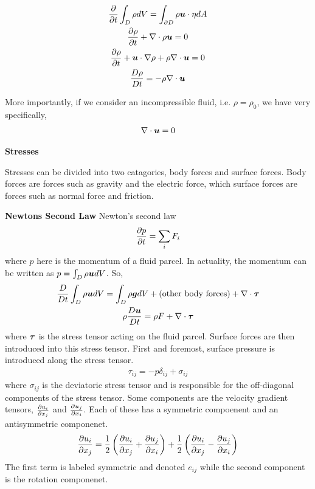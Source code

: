 \documentclass{article}
\begin{document}
\begin{gather*}
    \frac{\partial }{\partial t}\int_D\rho dV = \int_{\partial D} \rho\boldsymbol{u} \cdot \eta dA\\
    \frac{\partial \rho}{\partial t} + \nabla\cdot \rho\boldsymbol{u} = 0 \\
    \frac{\partial \rho}{\partial t} + \boldsymbol{u}\cdot\nabla\rho + \rho\nabla\cdot\boldsymbol{u} = 0\\
    \frac{D\rho}{Dt} = - \rho \nabla\cdot\boldsymbol{u}
\end{gather*}

More importantly, if we consider an incompressible fluid, i.e. $\rho = \rho_0$,
we have very specifically,
\begin{gather}
    \nabla \cdot \boldsymbol{u} = 0
\end{gather}


\vspace{20pt}
{\Large \textbf{Stresses}}
\vspace{5pt}

Stresses can be divided into two catagories, body forces and surface forces.
Body forces are forces such as gravity and the electric force, which surface forces are
forces such as normal force and friction. 

\vspace{20pt}
{\Large \textbf{Newtons Second Law}}
\vspace{5pt}
Newton's second law 
\begin{gather*}
    \frac{\partial p}{\partial t} = \sum_i F_i
\end{gather*}
where $p$ here is the momentum of a fluid parcel. In actuality, the momentum can
be written as $p = \int_D \rho\boldsymbol{u} dV$. So, 
\begin{gather*}
    \frac{D }{D t}\int_D \rho\boldsymbol{u} dV = \int_D \rho \boldsymbol{g} dV + (\text{other body
    forces}) + \nabla \cdot \boldsymbol{\tau}\\
    \rho\frac{D \boldsymbol{u}}{D t} = \rho F + \nabla\cdot\boldsymbol{\tau}
\end{gather*}
where $\boldsymbol{\tau}$ is the stress tensor acting on the fluid parcel. Surface
forces are then introduced into this stress tensor. First and foremost, surface
pressure is introduced along the stress tensor. 
\begin{gather*}
    \tau_{ij} = -p\delta_{ij} + \sigma_{ij}
\end{gather*}
where $\sigma_{ij}$ is the deviatoric stress tensor and is responsible for the
off-diagonal components of the stress tensor. Some components are the velocity
gradient tensors, $\frac{\partial u_i}{\partial x_j}$ and $\frac{\partial u_j}{\partial x_i}$. Each of these has a symmetric
compoenent and an antisymmetric componenet. 
\begin{gather*}
    \frac{\partial u_i}{\partial x_j} = \frac{1}{2}\left(\frac{\partial u_i}{\partial x_j} + \frac{\partial u_j}{\partial x_i}\right) +
    \frac{1}{2}\left(\frac{\partial u_i}{\partial x_j} - \frac{\partial u_j}{\partial x_i}\right)
\end{gather*}
The first term is labeled symmetric and denoted $e_{ij}$ while the second
component is the rotation componenet. 
\end{document}
